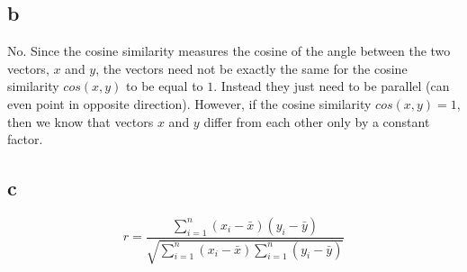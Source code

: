 \documentclass{article}
\begin{document}
\subsection{b}
No. Since the cosine similarity measures the cosine of the angle between the two vectors, $x$ and $y$, the vectors need not be exactly the same for the cosine similarity $cos(x,y)$ to be equal to $1$. Instead they just need to be parallel (can even point in opposite direction). However, if the cosine similarity $cos(x,y) = 1$, then we know that vectors $x$ and $y$ differ from each other only by a constant factor.

\subsection{c}
\begin{equation}
r = \frac{\sum_{i=1}^{n} (x_i - \bar{x}) (y_i - \bar{y})}{\sqrt{\sum_{i=1}^{n} (x_i - \bar{x}) \sum_{i=1}^{n} (y_i - \bar{y})}}
\end{equation}
\end{document}
